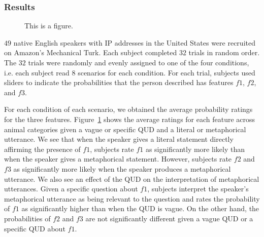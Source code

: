 \documentclass[10pt,letterpaper]{article}
\begin{document}
\subsubsection{Results}
\begin{figure}[ht]
\begin{center}
\end{center}
\caption{This is a figure.} 
\label{human_bar}
\end{figure}

$49$ native English speakers with IP addresses in the United States were recruited on Amazon's Mechanical Turk. Each subject completed $32$ trials in random order. The $32$ trials were randomly and evenly assigned to one of the four conditions, i.e. each subject read $8$ scenarios for each condition. For each trial, subjects used sliders to indicate the probabilities that the person described has features $f1$, $f2$, and $f3$.

For each condition of each scenario, we obtained the average probability ratings for the three features. Figure~\ref{human_bar} shows the average ratings for each feature across animal categories given a vague or specific QUD and a literal or metaphorical utterance. We see that when the speaker gives a literal statement directly affirming the presence of $f1$, subjects rate $f1$ as significantly more likely than when the speaker gives a metaphorical statement. However, subjects rate $f2$ and $f3$ as significantly more likely when the speaker produces a metaphorical utterance. We also see an effect of the QUD on the interpretation of metaphorical utterances. Given a specific question about $f1$, subjects interpret the speaker's metaphorical utterance as being relevant to the question and rates the probability of $f1$ as significantly higher than when the QUD is vague. On the other hand, the probabilities of $f2$ and $f3$ are not significantly different given a vague QUD or a specific QUD about $f1$.
\end{document}
